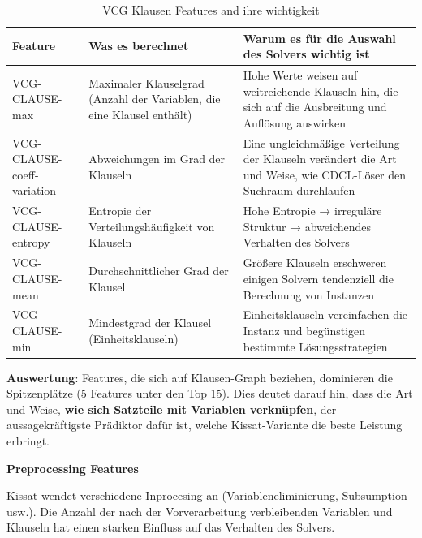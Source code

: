 \begin{table}[H]
    \centering
    \begin{tabular}{p{}p{}p{}}
        
        \textbf{Feature} & \textbf{Was es berechnet} & \textbf{Warum es für die Auswahl des Solvers wichtig ist} \\
        \toprule
        VCG-CLAUSE-max & Maximaler Klauselgrad (Anzahl der Variablen, die eine Klausel enthält) & Hohe Werte weisen auf weitreichende Klauseln hin, die sich auf die Ausbreitung und Auflösung auswirken \\
        \midrule
        VCG-CLAUSE-coeff-variation & Abweichungen im Grad der Klauseln & Eine ungleichmäßige Verteilung der Klauseln verändert die Art und Weise, wie CDCL-Löser den Suchraum durchlaufen \\
        \midrule
        VCG-CLAUSE-entropy & Entropie der Verteilungshäufigkeit von Klauseln & Hohe Entropie → irreguläre Struktur → abweichendes Verhalten des Solvers \\
        \midrule
        VCG-CLAUSE-mean & Durchschnittlicher Grad der Klausel & Größere Klauseln erschweren einigen Solvern tendenziell die Berechnung von Instanzen \\
        \midrule
        VCG-CLAUSE-min & Mindestgrad der Klausel (Einheitsklauseln) & Einheitsklauseln vereinfachen die Instanz und begünstigen bestimmte Lösungsstrategien \\
        \bottomrule
    \end{tabular}
    \caption{VCG Klausen Features and ihre wichtigkeit}\label{tab:vcg_features}
\end{table}

\newpage

\textbf{Auswertung}: Features, die sich auf Klausen-Graph beziehen, dominieren die 
Spitzenplätze (5 Features unter den Top 15). Dies deutet darauf hin, dass die Art und Weise, \textbf{wie sich 
Satzteile mit Variablen verknüpfen}, der aussagekräftigste Prädiktor dafür ist, welche Kissat-Variante 
die beste Leistung erbringt.

\textbf{Preprocessing Features}

Kissat wendet verschiedene Inprocesing an (Variableneliminierung, Subsumption usw.). Die Anzahl der nach
der Vorverarbeitung verbleibenden Variablen und Klauseln hat einen starken Einfluss auf das Verhalten des 
Solvers.

